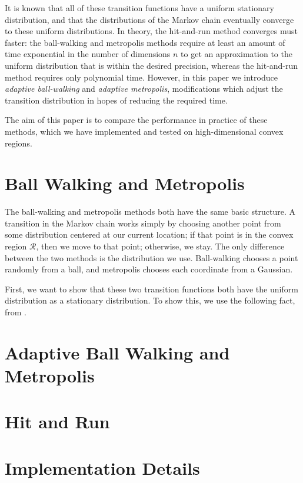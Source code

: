 \documentclass[11pt]{article}
\begin{document}
It is known that all of these transition functions have a uniform stationary distribution, and that the distributions of the Markov chain eventually converge to these uniform distributions. In theory, the hit-and-run method converges must faster: the ball-walking and metropolis methods require at least an amount of time exponential in the number of dimensions $n$ to get an approximation to the uniform distribution that is within the desired precision, whereas the hit-and-run method requires only polynomial time. However, in this paper we introduce \emph{adaptive ball-walking} and \emph{adaptive metropolis}, modifications which adjust the transition distribution in hopes of reducing the required time.

The aim of this paper is to compare the performance in practice of these methods, which we have implemented and tested on high-dimensional convex regions.

\section{Ball Walking and Metropolis}

The ball-walking and metropolis methods both have the same basic structure. A transition in the Markov chain works simply by choosing another point from some distribution centered at our current location; if that point is in the convex region $\mathcal{R}$, then we move to that point; otherwise, we stay. The only difference between the two methods is the distribution we use. Ball-walking chooses a point randomly from a ball, and metropolis chooses each coordinate from a Gaussian.

First, we want to show that these two transition functions both have the uniform distribution as a stationary distribution. To show this, we use the following fact, from \cite{Smith}.

\section{Adaptive Ball Walking and Metropolis}

\section{Hit and Run}

\section{Implementation Details}
\end{document}
